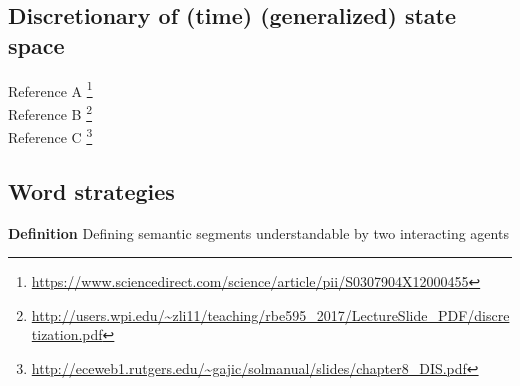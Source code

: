 \documentclass{article}
\begin{document}
			\subsection{Discretionary of (time) (generalized) state space}
			Reference A \footnote{\url{https://www.sciencedirect.com/science/article/pii/S0307904X12000455}}
			\\
			Reference B \footnote{\url{http://users.wpi.edu/~zli11/teaching/rbe595_2017/LectureSlide_PDF/discretization.pdf}}
			\\
			Reference C \footnote{\url{http://eceweb1.rutgers.edu/~gajic/solmanual/slides/chapter8_DIS.pdf}}
			\subsection{Word strategies}
				\textbf{Definition} Defining semantic segments understandable by two interacting agents
\end{document}
